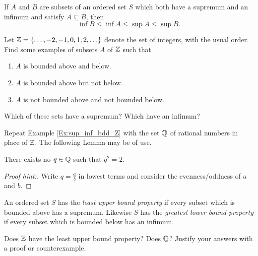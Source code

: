 \documentclass{book}
\begin{document}
\begin{prop}
If $A$ and $B$ are subsets of an ordered set $S$ which both have a supremum and an infimum and satisfy $A \subseteq B$, then
\begin{equation}
	\inf B \leq \inf A \leq \sup A \leq \sup B.
	\label{E:sup_inf_ineq}
\end{equation}
\label{P:inf_sup}
\end{prop}

\begin{ex}
Let $\mathbb{Z} = \left\{ \ldots, -2, -1, 0, 1, 2, \ldots \right\}$ denote the set of integers,
with the usual order. Find some examples of subsets $A$ of $\mathbb{Z}$ such that
\begin{enumerate}
\item $A$ is bounded above and below.
\item $A$ is bounded above but not below.
\item $A$ is not bounded above and not bounded below.
\end{enumerate}
Which of these sets have a supremum? Which have an infimum?
\label{Ex:sup_inf_bdd_Z}
\end{ex}

\begin{ex}
Repeat Example \ref{Ex:sup_inf_bdd_Z} with the set $\mathbb{Q}$ of rational numbers in place of $\mathbb{Z}$. The following Lemma may be of use.
\label{Ex:sup_inf_bdd_Q}
\end{ex}

\begin{lem}
There exists no $q \in \mathbb{Q}$ such that $q^2 = 2$. 
\label{L:sqrt_2_irrational}
\end{lem}
\begin{proof}[Proof hint:]
Write $q = \frac a b$ in lowest terms and consider the evenness/oddness of $a$ and $b$.
\end{proof}


\begin{defn}
An ordered set $S$ has the {\em least upper bound property} if every subset which is bounded
above has a supremum. Likewise $S$ has the {\em greatest lower bound property} if every subset which is bounded
below has an infimum.
\label{D:lub_prop}
\end{defn}

\begin{ex}
Does $\mathbb{Z}$ have the least upper bound property? Does $\mathbb{Q}$? Justify your answers with a proof or counterexample.
\label{Ex:Q_Z_lub}
\end{ex}
\end{document}
